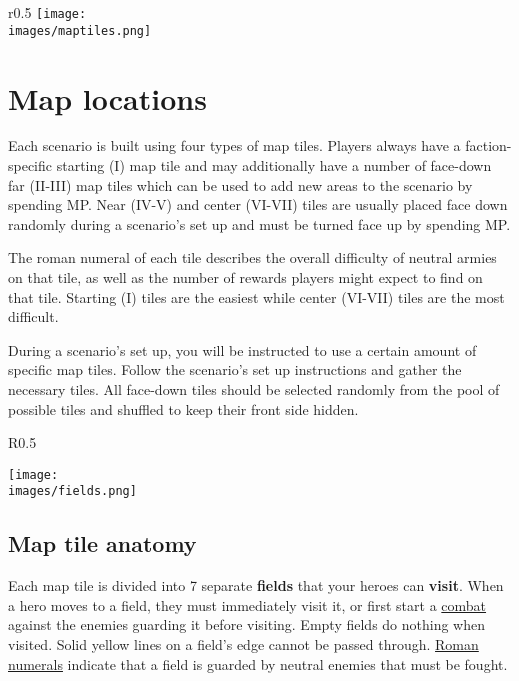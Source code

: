 \documentclass[12pt]{article}
\def\assets{assets}
\def\images{\assets/images}
\begin{document}
\clearpage

\begin{wrapfigure}{r}{0.5\textwidth}
\texttt{[image: \\images/maptiles.png]}
\end{wrapfigure}
\section{Map locations}
Each scenario is built using four types of map tiles. Players always have a faction-specific starting (I) map tile and may additionally have a number of face-down far (II-III) map tiles which can be used to add new areas to the scenario by spending MP. Near (IV-V) and center (VI-VII) tiles are usually placed face down randomly during a scenario’s set up and must be turned face up by spending MP.\par
The roman numeral of each tile describes the overall difficulty of neutral armies on that tile, as well as the number of rewards players might expect to find on that tile. Starting (I) tiles are the easiest while center (VI-VII) tiles are the most difficult.\par
During a scenario’s set up, you will be instructed to use a certain amount of specific map tiles. Follow the scenario’s set up instructions and gather the necessary tiles. All face-down tiles should be selected randomly from the pool of possible tiles and shuffled to keep their front side hidden.\par
\begin{wrapfigure}{R}{0.5\textwidth}
    \begin{center}
    \texttt{[image: \\images/fields.png]}
    \end{center}
\end{wrapfigure}
\subsection*{Map tile anatomy}
Each map tile is divided into 7 separate \textbf{fields} that your heroes can \textbf{visit}. When a hero moves to a field, they must immediately visit it, or
first start a \hyperlink{Combat}{combat} against the enemies guarding it before visiting. Empty fields do nothing when visited. Solid yellow lines on a field's edge cannot be passed through. \hyperlink{Difficulty}{Roman numerals} indicate that a field is guarded by neutral enemies that must be fought.\par

\clearpage
\end{document}
